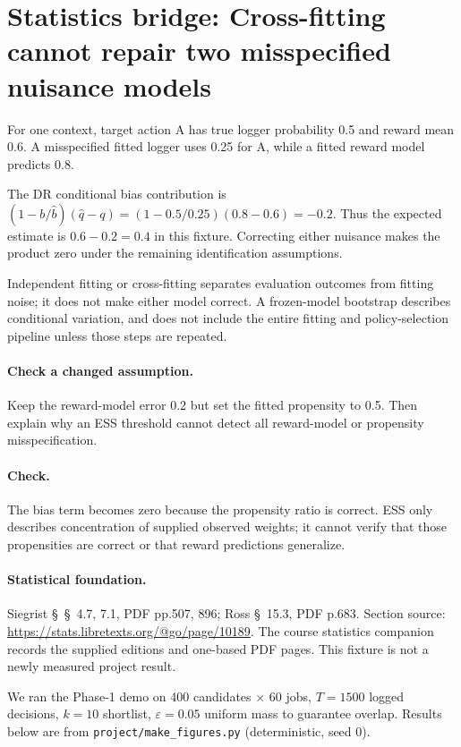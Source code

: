 \documentclass[11pt,oneside]{scrbook}
\begin{document}
\section{Statistics bridge: Cross-fitting cannot repair two misspecified nuisance models}
\begin{example}
For one context, target action A has true logger probability 0.5 and reward mean 0.6. A misspecified fitted logger uses 0.25 for A, while a fitted reward model predicts 0.8.

The DR conditional bias contribution is $(1-b/\widehat b)(\widehat q-q)=(1-0.5/0.25)(0.8-0.6)=-0.2$. Thus the expected estimate is $0.6-0.2=0.4$ in this fixture. Correcting either nuisance makes the product zero under the remaining identification assumptions.
\end{example}
Independent fitting or cross-fitting separates evaluation outcomes from fitting noise; it does not make either model correct. A frozen-model bootstrap describes conditional variation, and does not include the entire fitting and policy-selection pipeline unless those steps are repeated.

\paragraph{Check a changed assumption.} Keep the reward-model error 0.2 but set the fitted propensity to 0.5. Then explain why an ESS threshold cannot detect all reward-model or propensity misspecification.
\paragraph{Check.} The bias term becomes zero because the propensity ratio is correct. ESS only describes concentration of supplied observed weights; it cannot verify that those propensities are correct or that reward predictions generalize.
\paragraph{Statistical foundation.} Siegrist \S~\S~4.7, 7.1, PDF pp.507, 896; Ross \S~15.3, PDF p.683. Section source: \url{https://stats.libretexts.org/@go/page/10189}. The course statistics companion records the supplied editions and one-based PDF pages. This fixture is not a newly measured project result.



We ran the Phase-1 demo on 400 candidates $\times$ 60 jobs, $T=1500$
logged decisions, $k=10$ shortlist, $\varepsilon=0.05$ uniform mass to
guarantee overlap. Results below are from
\texttt{project/make\_figures.py} (deterministic, seed 0).
\end{document}
